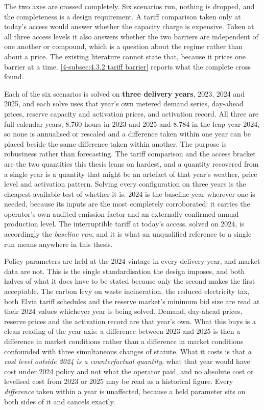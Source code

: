 The two axes are crossed completely. Six scenarios run, nothing is dropped, and the completeness is a design requirement. A tariff comparison taken only at today's access would answer whether the capacity charge is expensive. Taken at all three access levels it also answers whether the two barriers are independent of one another or compound, which is a question about the regime rather than about a price. The existing literature cannot state that, because it prices one barrier at a time. \autoref{4-subsec:4.3.2 tariff barrier} reports what the complete cross found.

Each of the six scenarios is solved on \textbf{three delivery years}, 2023, 2024 and 2025, and each solve uses that year's own metered demand series, day-ahead prices, reserve capacity and activation prices, and activation record. All three are full calendar years, 8,760 hours in 2023 and 2025 and 8,784 in the leap year 2024, so none is annualised or rescaled and a difference taken within one year can be placed beside the same difference taken within another. The purpose is robustness rather than forecasting. The tariff comparison and the access bracket are the two quantities this thesis leans on hardest, and a quantity recovered from a single year is a quantity that might be an artefact of that year's weather, price level and activation pattern. Solving every configuration on three years is the cheapest available test of whether it is. 2024 is the baseline year wherever one is needed, because its inputs are the most completely corroborated: it carries the operator's own audited emission factor and an externally confirmed annual production level. The interruptible tariff at today's access, solved on 2024, is accordingly the \emph{baseline run}, and it is what an unqualified reference to a single run means anywhere in this thesis.

Policy parameters are held at the 2024 vintage in every delivery year, and market data are not. This is the single standardisation the design imposes, and both halves of what it does have to be stated because only the second makes the first acceptable. The carbon levy on waste incineration, the reduced electricity tax, both Elvia tariff schedules and the reserve market's minimum bid size are read at their 2024 values whichever year is being solved. Demand, day-ahead prices, reserve prices and the activation record are that year's own. What this buys is a clean reading of the year axis: a difference between 2023 and 2025 is then a difference in market conditions rather than a difference in market conditions confounded with three simultaneous changes of statute. What it costs is that \emph{a cost level outside 2024 is a counterfactual quantity}, what that year would have cost under 2024 policy and not what the operator paid, and no absolute cost or levelised cost from 2023 or 2025 may be read as a historical figure. Every \emph{difference} taken within a year is unaffected, because a held parameter sits on both sides of it and cancels exactly.

